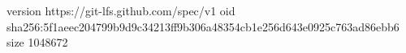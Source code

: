 version https://git-lfs.github.com/spec/v1
oid sha256:5f1aeec204799b9d9c34213ff9b306a48354cb1e256d643e0925c763ad86ebb6
size 1048672
